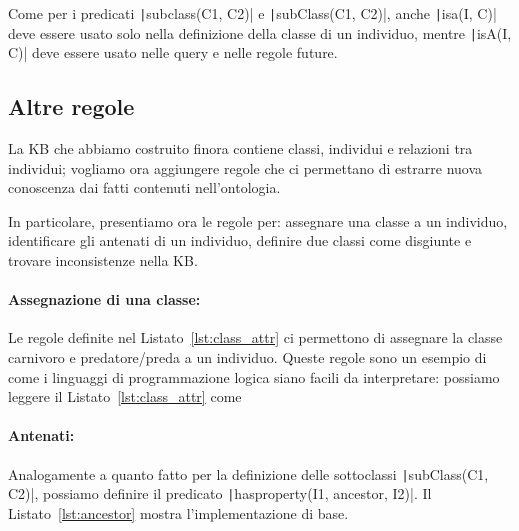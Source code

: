 \begin{listingenv}[h]
	\caption{Predicato isA}
	\label{lst:isa}
\end{listingenv}

Come per i predicati \texttt|subclass(C1, C2)| e \texttt|subClass(C1, C2)|, anche \texttt|isa(I, C)| deve essere usato solo nella definizione della classe di un individuo, mentre \texttt|isA(I, C)| deve essere usato nelle query e nelle regole future.

\subsection{Altre regole}
La KB che abbiamo costruito finora contiene classi, individui e relazioni tra individui; vogliamo ora aggiungere regole che ci permettano di estrarre nuova conoscenza dai fatti contenuti nell'ontologia. 

In particolare, presentiamo ora le regole per: assegnare una classe a un individuo, identificare gli antenati di un individuo, definire due classi come disgiunte e trovare inconsistenze nella KB.

\paragraph{Assegnazione di una classe:} Le regole definite nel Listato~\ref{lst:class_attr} ci permettono di assegnare la classe carnivoro e predatore/preda a un individuo. Queste regole sono un esempio di come i linguaggi di programmazione logica siano facili da interpretare: possiamo leggere il Listato~\ref{lst:class_attr} come 
\begin{listingenv}[h]
	\caption{Regole di attribuzione delle classi}
	\label{lst:class_attr}
\end{listingenv}

\paragraph{Antenati:} Analogamente a quanto fatto per la definizione delle sottoclassi \texttt|subClass(C1, C2)|, possiamo definire il predicato \texttt|hasproperty(I1, ancestor, I2)|. Il Listato~\ref{lst:ancestor} mostra l'implementazione di base. 

